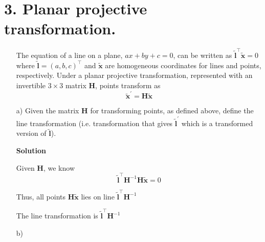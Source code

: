 \documentclass[a4paper,12pt]{article}
\begin{document}
\section*{3. Planar projective transformation.}
\begin{itemize}
\item[ ] The equation of a line on a plane, $ax + by + c = 0$, can be written as 
$\tilde{\mathbf{l}}^\intercal \tilde{\mathbf{x}} = 0$  where $\tilde{\mathbf{l}} = (a,b,c)^\intercal$  and $ \tilde{\mathbf{x}}$ are homogeneous coordinates for lines and points, respectively. Under
a planar projective transformation, represented with an invertible $3 \times 3$ matrix $\mathbf{H}$, points
transform as $$\tilde{\mathbf{x}}^\prime = \mathbf{H} \tilde{\mathbf{x}}$$
\item[a)]  Given the matrix $\mathbf{H}$ for transforming points, as defined above, define the line transformation (i.e. transformation that gives $\tilde{\mathbf{l}}^\prime$ which is a transformed version of $\tilde{\mathbf{l}}$).

\textbf{Solution}

Given $\mathbf{H}$, we know $$\tilde{\mathbf{l}}^\intercal \mathbf{H}^{-1} \mathbf{H} \tilde{\mathbf{x}} = 0$$

Thus, all points $\mathbf{H} \tilde{\mathbf{x}}$ lies on line $\tilde{\mathbf{l}}^\intercal \mathbf{H}^{-1}$

The line transformation is $\tilde{\mathbf{l}}^\intercal \mathbf{H}^{-1}$

\item[b)]

\end{itemize}
\end{document}
